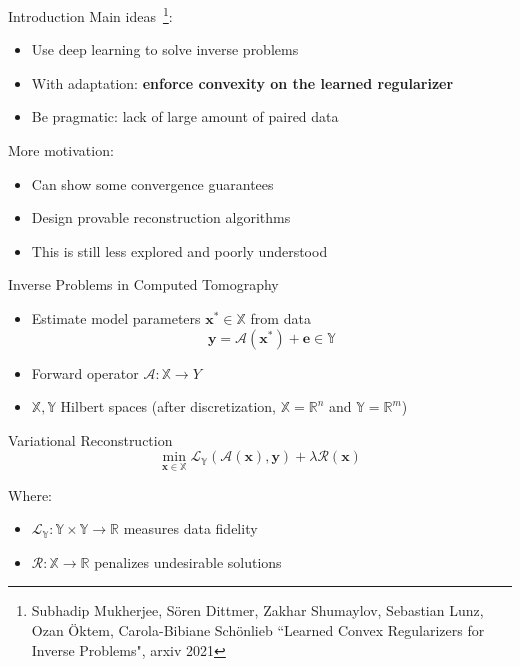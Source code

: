 \documentclass{beamer}
\begin{document}
\begin{frame}{Introduction}
Main ideas~\footnote{{\tiny \color{blue} Subhadip Mukherjee, Sören Dittmer, Zakhar Shumaylov, Sebastian Lunz, Ozan Öktem, Carola-Bibiane Schönlieb ``Learned Convex Regularizers for Inverse Problems", arxiv 2021}}:
\begin{itemize}
  \item Use deep learning to solve inverse problems
  \item With adaptation: {\bf enforce convexity on the learned regularizer} 
  \item Be pragmatic: lack of large amount of paired data
\end{itemize}
\vspace{1cm}
More motivation:
\begin{itemize}
\item Can show some convergence guarantees 
\item Design provable reconstruction algorithms
\item This is still less explored and poorly understood
\end{itemize}
\end{frame}

\begin{frame}{Inverse Problems in Computed Tomography}
\begin{itemize}
\item Estimate model parameters $\pmb{x}^{*} \in \mathbb{X}$ from data
$$
\pmb{y} = \mathcal{A}(\pmb{x}^{*}) + \pmb{e} \in \mathbb{Y}
$$
\item Forward operator $\mathcal{A}: \mathbb{X} \rightarrow Y$
\item $\mathbb{X}, \mathbb{Y}$ Hilbert spaces (after discretization, $\mathbb{X} = \mathbb{R}^{n}$ and $\mathbb{Y} = \mathbb{R}^{m}$)
\end{itemize}
\begin{block}{Variational Reconstruction}
$$
\min\limits_{\pmb{x} \in \mathbb{X}} \mathcal{L}_{\mathbb{Y}}\left( 
\mathcal{A}(\pmb{x}), \pmb{y}\right) + \lambda \mathcal{R}(\pmb{x})
$$
\end{block}
Where:
\begin{itemize}
\item $\mathcal{L}_{\mathbb{Y}}: \mathbb{Y} \times \mathbb{Y} \rightarrow \mathbb{R}$ measures data fidelity
\item $\mathcal{R}: \mathbb{X} \rightarrow \mathbb{R}$ penalizes undesirable solutions
\end{itemize}

\end{frame}
\end{document}
